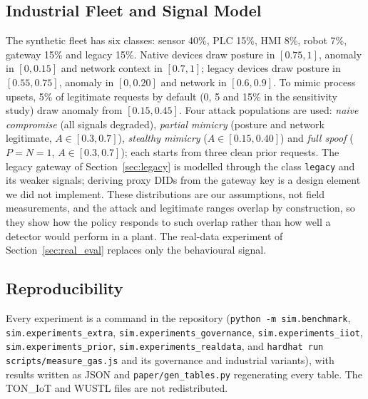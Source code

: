 \subsection{Industrial Fleet and Signal Model}\label{sec:devsim}
The synthetic fleet has six classes: sensor 40\%, PLC 15\%, HMI 8\%, robot 7\%, gateway 15\% and legacy 15\%. Native devices draw posture in $[0.75,1]$, anomaly in $[0,0.15]$ and network context in $[0.7,1]$; legacy devices draw posture in $[0.55,0.75]$, anomaly in $[0,0.20]$ and network in $[0.6,0.9]$. To mimic process upsets, 5\% of legitimate requests by default (0, 5 and 15\% in the sensitivity study) draw anomaly from $[0.15,0.45]$. Four attack populations are used: \emph{naive compromise} (all signals degraded), \emph{partial mimicry} (posture and network legitimate, $A\in[0.3,0.7]$), \emph{stealthy mimicry} ($A\in[0.15,0.40]$) and \emph{full spoof} ($P=N=1$, $A\in[0.3,0.7]$); each starts from three clean prior requests. The legacy gateway of Section~\ref{sec:legacy} is modelled through the class \texttt{legacy} and its weaker signals; deriving proxy DIDs from the gateway key is a design element we did not implement. These distributions are our assumptions, not field measurements, and the attack and legitimate ranges overlap by construction, so they show how the policy responds to such overlap rather than how well a detector would perform in a plant. The real-data experiment of Section~\ref{sec:real_eval} replaces only the behavioural signal.

\subsection{Reproducibility}\label{sec:scenarios}
Every experiment is a command in the repository (\texttt{python -m sim.benchmark}, \texttt{sim.experiments\_extra}, \texttt{sim.experiments\_governance}, \texttt{sim.experiments\_iiot}, \texttt{sim.experiments\_prior}, \texttt{sim.experiments\_realdata}, and \texttt{hardhat run scripts/measure\_gas.js} and its governance and industrial variants), with results written as JSON and \texttt{paper/gen\_tables.py} regenerating every table. The TON\_IoT and WUSTL files are not redistributed.

